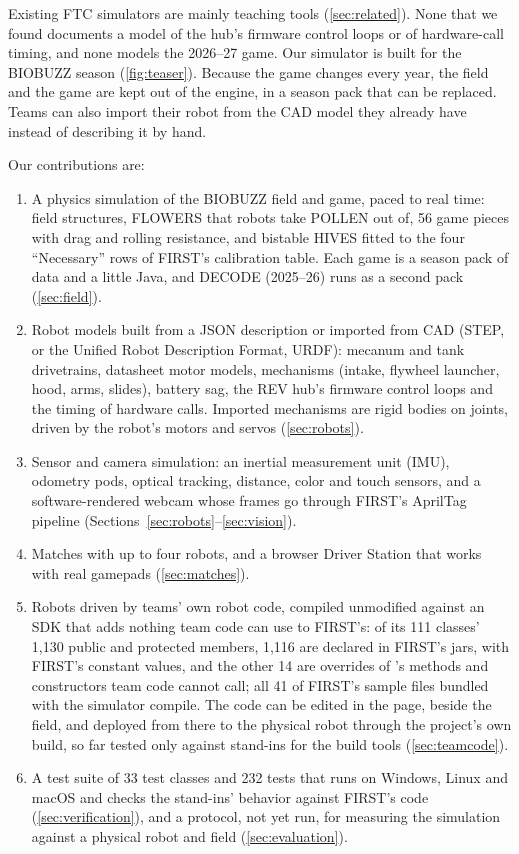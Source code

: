 \documentclass[10pt,twocolumn,letterpaper]{article}
\begin{document}
Existing FTC simulators are mainly teaching tools (\cref{sec:related}). None that we found documents a model of the hub's firmware control loops or of hardware-call timing, and none models the 2026–27 game. Our simulator is built for the BIOBUZZ season (\cref{fig:teaser}). Because the game changes every year, the field and the game are kept out of the engine, in a season pack that can be replaced. Teams can also import their robot from the CAD model they already have instead of describing it by hand.

Our contributions are:

\begin{enumerate}
\item A physics simulation of the BIOBUZZ field and game, paced to real time: field structures, FLOWERS that robots take POLLEN out of, 56 game pieces with drag and rolling resistance, and bistable HIVES fitted to the four “Necessary” rows of FIRST’s calibration table. Each game is a season pack of data and a little Java, and DECODE (2025–26) runs as a second pack (\cref{sec:field}).
\item Robot models built from a JSON description or imported from CAD (STEP, or the Unified Robot Description Format, URDF): mecanum and tank drivetrains, datasheet motor models, mechanisms (intake, flywheel launcher, hood, arms, slides), battery sag, the REV hub's firmware control loops and the timing of hardware calls. Imported mechanisms are rigid bodies on joints, driven by the robot's motors and servos (\cref{sec:robots}).
\item Sensor and camera simulation: an inertial measurement unit (IMU), odometry pods, optical tracking, distance, color and touch sensors, and a software-rendered webcam whose frames go through FIRST's AprilTag pipeline (Sections~\ref{sec:robots}--\ref{sec:vision}).
\item Matches with up to four robots, and a browser Driver Station that works with real gamepads (\cref{sec:matches}).
\item Robots driven by teams’ own robot code, compiled unmodified against an SDK that adds nothing team code can use to FIRST's: of its 111 classes' 1,130 public and protected members, 1,116 are declared in FIRST's jars, with FIRST's constant values, and the other 14 are overrides of 's methods and constructors team code cannot call; all 41 of FIRST’s sample files bundled with the simulator compile. The code can be edited in the page, beside the field, and deployed from there to the physical robot through the project's own build, so far tested only against stand-ins for the build tools (\cref{sec:teamcode}).
\item A test suite of 33 test classes and 232 tests that runs on Windows, Linux and macOS and checks the stand-ins' behavior against FIRST's code (\cref{sec:verification}), and a protocol, not yet run, for measuring the simulation against a physical robot and field (\cref{sec:evaluation}).
\end{enumerate}
\end{document}
